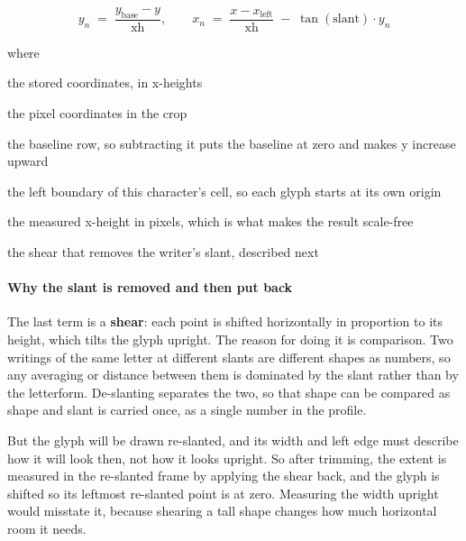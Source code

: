 \begin{equation}
y_n \;=\; \frac{y_{\mathrm{base}} - y}{\mathrm{xh}}, \qquad x_n \;=\; \frac{x - x_{\mathrm{left}}}{\mathrm{xh}} \;-\; \tan(\mathrm{slant}) \cdot y_n
\end{equation}

\noindent where
\begin{description}[leftmargin=2.4em,style=nextline,font=\normalfont\ttfamily]\setlength\itemsep{1pt}
  \item[{$x_n,\, y_n$}] \normalfont the stored coordinates, in x-heights
  \item[{$x,\, y$}] \normalfont the pixel coordinates in the crop
  \item[{$y_{\mathrm{base}}$}] \normalfont the baseline row, so subtracting it puts the baseline at zero and makes y increase upward
  \item[{$x_{\mathrm{left}}$}] \normalfont the left boundary of this character's cell, so each glyph starts at its own origin
  \item[{$\mathrm{xh}$}] \normalfont the measured x-height in pixels, which is what makes the result scale-free
  \item[{$\tan(\mathrm{slant})$}] \normalfont the shear that removes the writer's slant, described next
\end{description}

\paragraph{Why the slant is removed and then put back}
The last term is a \textbf{shear}: each point is shifted horizontally in proportion to its height, which tilts the glyph upright. The reason for doing it is comparison. Two writings of the same letter at different slants are different shapes as numbers, so any averaging or distance between them is dominated by the slant rather than by the letterform. De-slanting separates the two, so that shape can be compared as shape and slant is carried once, as a single number in the profile.

But the glyph will be drawn re-slanted, and its width and left edge must describe how it will look then, not how it looks upright. So after trimming, the extent is measured in the re-slanted frame by applying the shear back, and the glyph is shifted so its leftmost re-slanted point is at zero. Measuring the width upright would misstate it, because shearing a tall shape changes how much horizontal room it needs.


